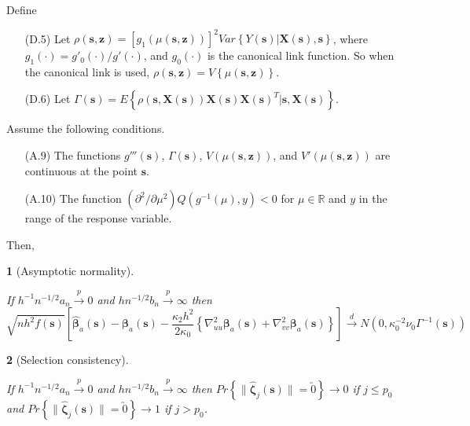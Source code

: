 \documentclass[12pt,english,authoryear, review]{article}\usepackage[]{graphicx}\usepackage[]{color}
\theoremstyle{plain}
\newtheorem{thm}{\protect\theoremname}
\theoremstyle{plain}
\providecommand{\theoremname}{Theorem}
\begin{document}
Define
\begin{itemize}
\item[(D.5)] Let $\rho\left(\bm{s},\bm{z}\right)=\left[g_{1}\left(\mu\left(\bm{s},\bm{z}\right)\right)\right]^{2}Var\left\{ Y\left(\bm{s}\right)|\bm{X}\left(\bm{s}\right),\bm{s}\right\} $,
where $g_{1}\left(\cdot\right)=g'_{0}\left(\cdot\right)/g'\left(\cdot\right)$,
and $g_{0}\left(\cdot\right)$ is the canonical link function. So
when the canonical link is used, $\rho\left(\bm{s},\bm{z}\right)=V\left\{ \mu\left(\bm{s},\bm{z}\right)\right\} $.
\item[(D.6)] Let $\Gamma\left(\bm{s}\right)=E\left\{ \rho\left(\bm{s},\bm{X}\left(\bm{s}\right)\right)\bm{X}\left(\bm{s}\right)\bm{X}\left(\bm{s}\right)^{T}|\bm{s},\bm{X}\left(\bm{s}\right)\right\} $.
\end{itemize}
Assume the following conditions.
\begin{itemize}
\item[(A.9)] The functions $g'''\left(\bm{s}\right)$, $\Gamma\left(\bm{s}\right)$,
$V\left(\mu\left(\bm{s},\bm{z}\right)\right)$, and $V'\left(\mu\left(\bm{s},\bm{z}\right)\right)$
are continuous at the point $\bm{s}$.
\item[(A.10)] The function $\left(\partial^{2}/\partial\mu^{2}\right)Q\left(g^{-1}\left(\mu\right),y\right)<0$
for $\mu\in\mathbb{R}$ and $y$ in the range of the response variable.
\end{itemize}
Then,
\begin{thm}[Asymptotic normality]
\label{theorem:normality-glm} 



If $h^{-1}n^{-1/2}a_{n}\xrightarrow{p}0$ and $hn^{-1/2}b_{n}\xrightarrow{p}\infty$
then 
\[
\sqrt{nh^{2}f\left(\bm{s}\right)}\left[\hat{\bm{\beta}}_{a}(\bm{s})-\bm{\beta}_{a}(\bm{s})-\frac{\kappa_{2}h^{2}}{2\kappa_{0}}\left\{ \nabla_{uu}^{2}\bm{\beta}_{a}(\bm{s})+\nabla_{vv}^{2}\bm{\beta}_{a}(\bm{s})\right\} \right]\xrightarrow{d}N\left(0,\kappa_{0}^{-2}\nu_{0}\Gamma^{-1}(\bm{s})\right)
\]

\end{thm}

\begin{thm}[Selection consistency]
\label{theorem:selection-glm}



If $h^{-1}n^{-1/2}a_{n}\xrightarrow{p}0$ and $hn^{-1/2}b_{n}\xrightarrow{p}\infty$
then $Pr\left\{ \|\hat{\bm{\zeta}}_{j}(\bm{s})\|=\utilde{0}\right\} \to0$
if $j\le p_{0}$ and $Pr\left\{ \|\hat{\bm{\zeta}}_{j}(\bm{s})\|=\utilde{0}\right\} \to1$
if $j>p_{0}$. 
\end{thm}
\appendix
\end{document}
